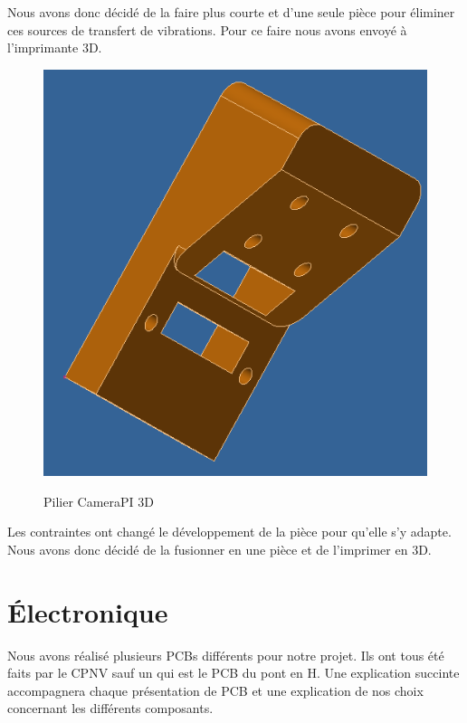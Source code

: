 \documentclass[
	a4paper,									%
	11pt,										%
	twoside,									%
	openright,									%
	notitlepage,									%
	parskip=half,								%
]{scrreprt}										%
\begin{document}
Nous avons donc décidé de la faire plus courte et d'une seule pièce pour éliminer ces sources de transfert de vibrations. 
Pour ce faire nous avons envoyé à l'imprimante 3D. \par

\begin{figure}[!h]
	\centering 
	\includegraphics[scale=.4]{img/SupportCameraPIV2.png}
	\label{SupportCameraPIV2}
	\caption{Pilier CameraPI 3D}	
\end{figure}

Les contraintes ont changé le développement de la pièce pour qu'elle s'y adapte. Nous avons donc décidé de 
la fusionner en une pièce et de l'imprimer en 3D. \par

\chapter{Électronique}

Nous avons réalisé plusieurs PCBs différents pour notre projet. Ils ont tous été faits par le CPNV sauf 
un qui est le PCB du pont en H. Une explication succinte accompagnera chaque présentation de PCB et une 
explication de nos choix concernant les différents composants. \par
\end{document}
